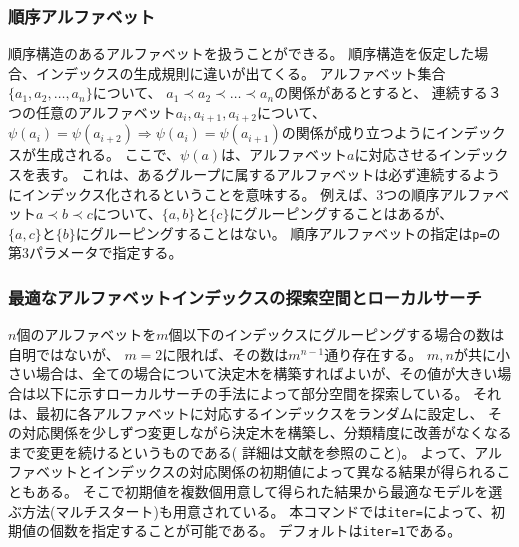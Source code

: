 \subsubsection{順序アルファベット}
順序構造のあるアルファベットを扱うことができる。
順序構造を仮定した場合、インデックスの生成規則に違いが出てくる。
アルファベット集合$\{a_1,a_2,\dots,a_n\}$について、
$a_1 \prec a_2 \prec \dots \prec a_n$の関係があるとすると、
連続する３つの任意のアルファベット$a_i,a_{i+1},a_{i+2}$について、
$\psi(a_i)=\psi(a_{i+2}) \Rightarrow \psi(a_i)=\psi(a_{i+1})$の関係が成り立つようにインデックスが生成される。
ここで、$\psi(a)$は、アルファベット$a$に対応させるインデックスを表す。
これは、あるグループに属するアルファベットは必ず連続するようにインデックス化されるということを意味する。
例えば、3つの順序アルファベット$a \prec b \prec c$について、$\{a,b\}と\{c\}$にグルーピングすることはあるが、
$\{a,c\}と\{b\}$にグルーピングすることはない。
順序アルファベットの指定は\verb|p=|の第3パラメータで指定する。

\subsubsection{最適なアルファベットインデックスの探索空間とローカルサーチ}
$n$個のアルファベットを$m$個以下のインデックスにグルーピングする場合の数は自明ではないが、
$m=2$に限れば、その数は$m^{n-1}$通り存在する。
$m,n$が共に小さい場合は、全ての場合について決定木を構築すればよいが、その値が大きい場合は以下に示すローカルサーチの手法によって部分空間を探索している。
それは、最初に各アルファベットに対応するインデックスをランダムに設定し、
その対応関係を少しずつ変更しながら決定木を構築し、分類精度に改善がなくなるまで変更を続けるというものである(
詳細は文献\cite{SSS94}を参照のこと)。
よって、アルファベットとインデックスの対応関係の初期値によって異なる結果が得られることもある。
そこで初期値を複数個用意して得られた結果から最適なモデルを選ぶ方法(マルチスタート)も用意されている。
本コマンドでは\verb|iter=|によって、初期値の個数を指定することが可能である。
デフォルトは\verb|iter=1|である。

